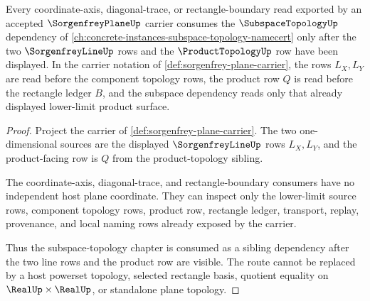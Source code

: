 \begin{theorem}
\label{thm:sorgenfrey-plane-subspace-dependency-route}
Every coordinate-axis, diagonal-trace, or rectangle-boundary read exported by an accepted $\SorgenfreyPlaneUp$ carrier consumes the $\SubspaceTopologyUp$ dependency of \autoref{ch:concrete-instances-subspace-topology-namecert} only after the two $\SorgenfreyLineUp$ rows and the $\ProductTopologyUp$ row have been displayed. In the carrier notation of \autoref{def:sorgenfrey-plane-carrier}, the rows $L_X,L_Y$ are read before the component topology rows, the product row $Q$ is read before the rectangle ledger $B$, and the subspace dependency reads only that already displayed lower-limit product surface.
\end{theorem}
\begin{proof}
Project the carrier of \autoref{def:sorgenfrey-plane-carrier}. The two one-dimensional sources are the displayed $\SorgenfreyLineUp$ rows $L_X,L_Y$, and the product-facing row is $Q$ from the product-topology sibling.

The coordinate-axis, diagonal-trace, and rectangle-boundary consumers have no independent host plane coordinate. They can inspect only the lower-limit source rows, component topology rows, product row, rectangle ledger, transport, replay, provenance, and local naming rows already exposed by the carrier.

Thus the subspace-topology chapter is consumed as a sibling dependency after the two line rows and the product row are visible. The route cannot be replaced by a host powerset topology, selected rectangle basis, quotient equality on $\RealUp\times\RealUp$, or standalone plane topology.
\end{proof}
